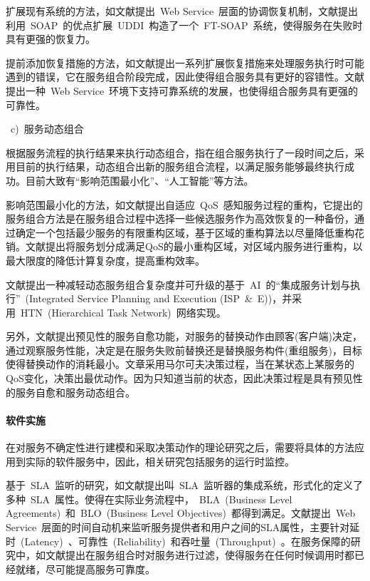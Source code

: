 扩展现有系统的方法，如文献\cite{cabrera2002web}提出~Web Service~层面的协调恢复机制，文献\cite{jeckle2003active}提出利用~SOAP~的优点扩展~UDDI~构造了一个~FT-SOAP~系统，使得服务在失败时具有更强的恢复力。

提前添加恢复措施的方法，如文献\cite{erradi2006recovery}提出一系列扩展恢复措施来处理服务执行时可能遇到的错误，它在服务组合阶段完成，因此使得组合服务具有更好的容错性。文献\cite{issarny2003coordinated}提出一种~Web Service~环境下支持可靠系统的发展，也使得组合服务具有更强的可靠性。

~c)~服务动态组合

根据服务流程的执行结果来执行动态组合，指在组合服务执行了一段时间之后，采用目前的执行结果，动态组合出新的服务组合流程，以满足服务能够最终执行成功。目前大致有“影响范围最小化”、“人工智能”等方法。

影响范围最小化的方法，如文献\cite{li2011adaptive}提出自适应~QoS~感知服务过程的重构，它提出的服务组合方法是在服务组合过程中选择一些候选服务作为高效恢复的一种备份，通过确定一个包括最少服务的有限重构区域，基于区域的重构算法以尽量降低重构花销。文献\cite{lin2009efficient}提出将服务划分成满足QoS的最小重构区域，对区域内服务进行重构，以最大限度的降低计算复杂度，提高重构效率。

文献\cite{madhusudan2006declarative}提出一种减轻动态服务组合复杂度并可升级的基于~AI~的“集成服务计划与执行”~(Integrated Service Planning and Execution (ISP~\&~E))，并采用~HTN~(Hierarchical Task Network)~网络实现。

另外，文献\cite{pillai2009optimal}提出预见性的服务自愈功能，对服务的替换动作由顾客(客户端)决定，通过观察服务性能，决定是在服务失败前替换还是替换服务构件(重组服务)，目标使得替换动作的消耗最小。文章采用马尔可夫决策过程，当在某状态上某服务的QoS变化，决策出最优动作。因为只知道当前的状态，因此决策过程是具有预见性的服务自愈和服务动态组合。

\paragraph{软件实施}

在对服务不确定性进行建模和采取决策动作的理论研究之后，需要将具体的方法应用到实际的软件服务中，因此，相关研究包括服务的运行时监控。

基于~SLA~监听的研究，如文献\cite{goel2011sla}提出叫~SLA~监听器的集成系统，形式化的定义了多种~SLA~属性。使得在实际业务流程中，~BLA~(Business Level Agreements)~和~BLO~(Business Level Objectives)~都得到满足。文献\cite{raimondi2008efficient}提出~Web Service~层面的时间自动机来监听服务提供者和用户之间的SLA属性，主要针对延时~(Latency)~、可靠性~(Reliability)~和吞吐量~(Throughput)~。在服务保障的研究中，如文献\cite{bravetti2007theory}\cite{bravetti2009theory}提出在服务组合时对服务进行过滤，使得服务在任何时候调用时都已经就绪，尽可能提高服务可靠度。

